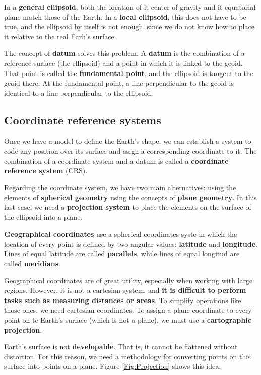 In a \textbf{general ellipsoid}, both the location of it center of gravity and it equatorial plane match those of the Earth. In a \textbf{local ellipsoid}, this does not have to be true, and the ellipsoid by itself is not enough, since we do not know how to place it relative to the real Earh's surface.

The concept of \textbf{datum} solves this problem. A \textbf{datum} is the combination of a reference surface (the ellipsoid) and a point in which it is linked to the geoid. That point is called the \textbf{fundamental point}, and the ellipsoid is tangent to the geoid there. At the fundamental point, a line perpendicular to the geoid is identical to a line perpendicular to the ellipsoid. 

\subsection{Coordinate reference systems}

Once we have a model to define the Earth's shape, we can establish a system to code any position over its surface and asign a corresponding coordinate to it. The combination of a coordinate system and a datum is called a \textbf{coordinate reference system} (CRS).

Regarding the coordinate system, we have two main alternatives: using the elements of \textbf{spherical geometry} using the concepts of \textbf{plane geometry}. In this last case, we need a \textbf{projection system} to place the elements on the surface of the ellipsoid into a plane.

\textbf{Geographical coordinates} use a spherical coordinates syste in which the location of every point is defined by two angular values: \textbf{latitude} and \textbf{longitude}. Lines of equal latitude are called \textbf{parallels}, while lines of equal longitud are called \textbf{meridians}.

Geographical coordinates are of great utility, especially when working with large regions. However, it is not a cartesian system, and \textbf{it is difficult to perform tasks such as measuring distances or areas}. To simplify operations like those ones, we need cartesian coordinates. To assign a plane coordinate to every point on te Earth's surface (which is not a plane), we must use a \textbf{cartographic projection}.

Earth's surface is not \textbf{developable}. That is, it cannot be flattened without distortion. For this reason, we need a methodology for converting points on this surface into points on a plane. Figure \ref{Fig:Projection} shows this idea.

